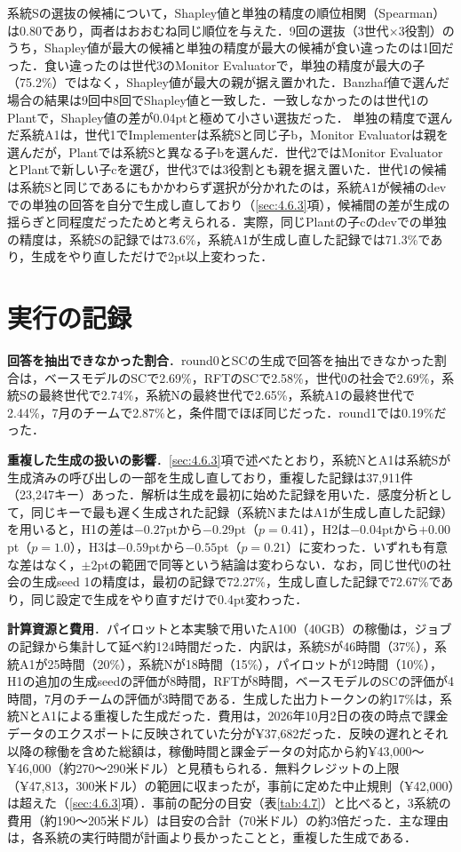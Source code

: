 系統Sの選抜の候補について，Shapley値と単独の精度の順位相関（Spearman）は0.80であり，両者はおおむね同じ順位を与えた．9回の選抜（3世代×3役割）のうち，Shapley値が最大の候補と単独の精度が最大の候補が食い違ったのは1回だった．食い違ったのは世代3のMonitor Evaluatorで，単独の精度が最大の子（75.2\%）ではなく，Shapley値が最大の親が据え置かれた．Banzhaf値で選んだ場合の結果は9回中8回でShapley値と一致した．一致しなかったのは世代1のPlantで，Shapley値の差が0.04ptと極めて小さい選抜だった．
単独の精度で選んだ系統A1は，世代1でImplementerは系統Sと同じ子b，Monitor Evaluatorは親を選んだが，Plantでは系統Sと異なる子bを選んだ．世代2ではMonitor EvaluatorとPlantで新しい子cを選び，世代3では3役割とも親を据え置いた．世代1の候補は系統Sと同じであるにもかかわらず選択が分かれたのは，系統A1が候補のdevでの単独の回答を自分で生成し直しており（\ref{sec:4.6.3}項），候補間の差が生成の揺らぎと同程度だったためと考えられる．実際，同じPlantの子cのdevでの単独の精度は，系統Sの記録では73.6\%，系統A1が生成し直した記録では71.3\%であり，生成をやり直しただけで2pt以上変わった．

\section{実行の記録}
\label{sec:5.6}

\textbf{回答を抽出できなかった割合}．round0とSCの生成で回答を抽出できなかった割合は，ベースモデルのSCで2.69\%，RFTのSCで2.58\%，世代0の社会で2.69\%，系統Sの最終世代で2.74\%，系統Nの最終世代で2.65\%，系統A1の最終世代で2.44\%，7月のチームで2.87\%と，条件間でほぼ同じだった．round1では0.19\%だった．

\textbf{重複した生成の扱いの影響}．\ref{sec:4.6.3}項で述べたとおり，系統NとA1は系統Sが生成済みの呼び出しの一部を生成し直しており，重複した記録は37,911件（23,247キー）あった．解析は生成を最初に始めた記録を用いた．感度分析として，同じキーで最も遅く生成された記録（系統NまたはA1が生成し直した記録）を用いると，H1の差は$-0.27$ptから$-0.29$pt（$p = 0.41$），H2は$-0.04$ptから$+0.00$pt（$p = 1.0$），H3は$-0.59$ptから$-0.55$pt（$p = 0.21$）に変わった．いずれも有意な差はなく，$\pm 2$ptの範囲で同等という結論は変わらない．なお，同じ世代0の社会の生成seed 1の精度は，最初の記録で72.27\%，生成し直した記録で72.67\%であり，同じ設定で生成をやり直すだけで0.4pt変わった．

\textbf{計算資源と費用}．パイロットと本実験で用いたA100（40GB）の稼働は，ジョブの記録から集計して延べ約124時間だった．内訳は，系統Sが46時間（37\%），系統A1が25時間（20\%），系統Nが18時間（15\%），パイロットが12時間（10\%），H1の追加の生成seedの評価が8時間，RFTが8時間，ベースモデルのSCの評価が4時間，7月のチームの評価が3時間である．生成した出力トークンの約17\%は，系統NとA1による重複した生成だった．費用は，2026年10月2日の夜の時点で課金データのエクスポートに反映されていた分が¥37,682だった．反映の遅れとそれ以降の稼働を含めた総額は，稼働時間と課金データの対応から約¥43,000〜¥46,000（約270〜290米ドル）と見積もられる．無料クレジットの上限（¥47,813，300米ドル）の範囲に収まったが，事前に定めた中止規則（¥42,000）は超えた（\ref{sec:4.6.3}項）．事前の配分の目安（表\ref{tab:4.7}）と比べると，3系統の費用（約190〜205米ドル）は目安の合計（70米ドル）の約3倍だった．主な理由は，各系統の実行時間が計画より長かったことと，重複した生成である．
